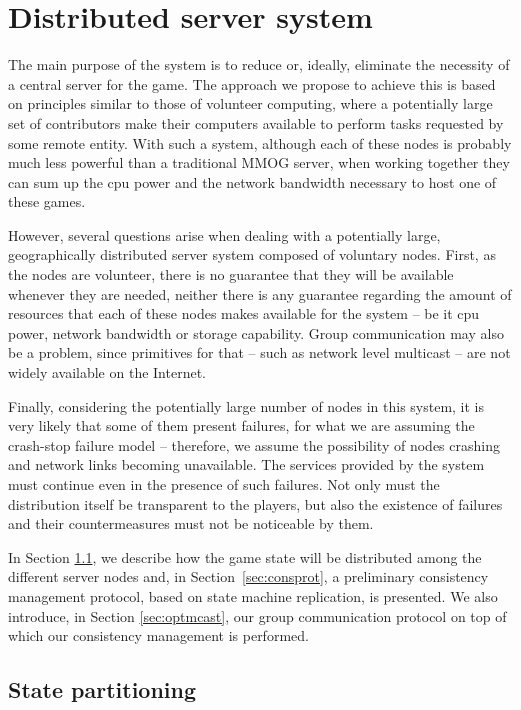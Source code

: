 \documentclass[]{usiinfprospectus}
\begin{document}
\section{Distributed server system} \label{sec:distserver}

The main purpose of the system is to reduce or, ideally, eliminate the necessity of a central server for the game. The approach we propose to achieve this is based on principles similar to those of volunteer computing, where a potentially large set of contributors make their computers available to perform tasks requested by some remote entity. With such a system, although each of these nodes is probably much less powerful than a traditional MMOG server, when working together they can sum up the cpu power and the network bandwidth necessary to host one of these games.

However, several questions arise when dealing with a potentially large, geographically distributed server system composed of voluntary nodes. First, as the nodes are volunteer, there is no guarantee that they will be available whenever they are needed, neither there is any guarantee regarding the amount of resources that each of these nodes makes available for the system -- be it cpu power, network bandwidth or storage capability. Group communication may also be a problem, since primitives for that -- such as network level multicast -- are not widely available on the Internet.

Finally, considering the potentially large number of nodes in this system, it is very likely that some of them present failures, for what we are assuming the crash-stop failure model -- therefore, we assume the possibility of nodes crashing and network links becoming unavailable. The services provided by the system must continue even in the presence of such failures. Not only must the distribution itself be transparent to the players, but also the existence of failures and their countermeasures must not be noticeable by them.

In Section \ref{sec:statepart}, we describe how the game state will be distributed among the different server nodes and, in \mbox{Section \ref{sec:consprot}}, a preliminary consistency management protocol, based on state machine replication, is presented. We also introduce, in Section \ref{sec:optmcast}, our group communication protocol on top of which our consistency management is performed.

\subsection{State partitioning} \label{sec:statepart}
\end{document}
